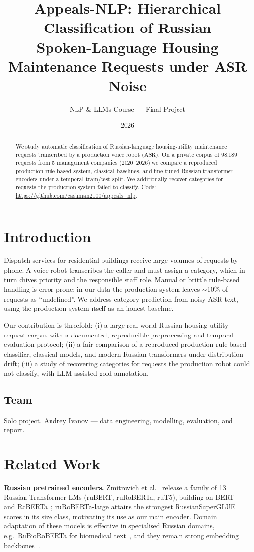 \documentclass[11pt]{article}
\title{Appeals-NLP: Hierarchical Classification of Russian\\
Spoken-Language Housing Maintenance Requests under ASR Noise}
\author{NLP \& LLMs Course --- Final Project}
\date{2026}
\begin{document}
\maketitle

\begin{abstract}
We study automatic classification of Russian-language housing-utility
maintenance requests transcribed by a production voice robot (ASR). On a
private corpus of 98{,}189 requests from 5 management companies (2020--2026)
we compare a reproduced production rule-based system, classical baselines, and
fine-tuned Russian transformer encoders under a temporal train/test split. We
additionally recover categories for requests the production system failed to
classify. Code: \url{https://github.com/cashman2100/appeals_nlp}.
\end{abstract}

\section{Introduction}
Dispatch services for residential buildings receive large volumes of requests
by phone. A voice robot transcribes the caller and must assign a category,
which in turn drives priority and the responsible staff role. Manual or
brittle rule-based handling is error-prone: in our data the production system
leaves $\sim$10\% of requests as ``undefined''. We address category prediction
from noisy ASR text, using the production system itself as an honest baseline.

Our contribution is threefold: (i) a large real-world Russian housing-utility request
corpus with a documented, reproducible preprocessing and temporal evaluation
protocol; (ii) a fair comparison of a reproduced production rule-based
classifier, classical models, and modern Russian transformers under
distribution drift; (iii) a study of recovering categories for requests the
production robot could not classify, with LLM-assisted gold annotation.

\subsection{Team}
Solo project. Andrey Ivanov --- data engineering, modelling, evaluation, and report.

\section{Related Work}
\textbf{Russian pretrained encoders.} Zmitrovich et al.~\cite{zmitrovich2024family}
release a family of 13 Russian Transformer LMs (ruBERT, ruRoBERTa, ruT5),
building on BERT~\cite{devlin2019bert} and RoBERTa~\cite{liu2019roberta};
ruRoBERTa-large attains the strongest RussianSuperGLUE
\cite{shavrina2020russiansuperglue} scores in its size class, motivating its
use as our main encoder. Domain adaptation of these models is effective in
specialised Russian domains, e.g.\ RuBioRoBERTa for biomedical
text~\cite{yalunin2022rubioroberta}, and they remain strong embedding
backbones~\cite{snegirev2024rumteb}.
\end{document}
